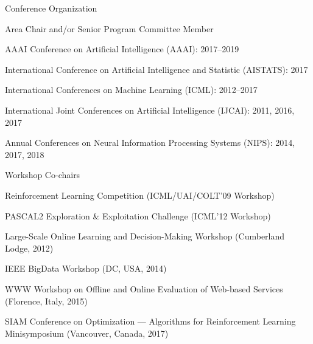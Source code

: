 \documentclass[10pt,twoside,letterpaper]{article}
\newcommand{\negitemspace}{\vspace{1mm}}
\begin{document}
\begin{compactitem}

\item{Conference Organization} \negitemspace

\begin{compactitem}

\item{Area Chair and/or Senior Program Committee Member}

\begin{compactitem}

\item{AAAI Conference on Artificial Intelligence (AAAI): 2017--2019}

\item{International Conference on Artificial Intelligence and Statistic (AISTATS): 2017}

\item{International Conferences on Machine Learning (ICML): 2012--2017}

\item{International Joint Conferences on Artificial Intelligence (IJCAI): 2011, 2016, 2017}

\item{Annual Conferences on Neural Information Processing Systems (NIPS): 2014, 2017, 2018}

\end{compactitem}

\item{Workshop Co-chairs}

\begin{compactitem}

\item{Reinforcement Learning Competition
(ICML/UAI/COLT'09 Workshop)}

\item{PASCAL2 Exploration \& Exploitation Challenge (ICML'12 Workshop)}

\item{Large-Scale Online Learning and Decision-Making Workshop (Cumberland Lodge, 2012)}

\item{IEEE BigData Workshop (DC, USA, 2014)}

\item{WWW Workshop on Offline and Online Evaluation of Web-based Services (Florence, Italy, 2015)}

\item{SIAM Conference on Optimization --- Algorithms for Reinforcement Learning Minisymposium (Vancouver, Canada, 2017)}


\end{compactitem}
\end{compactitem}
\end{compactitem}
\end{document}
